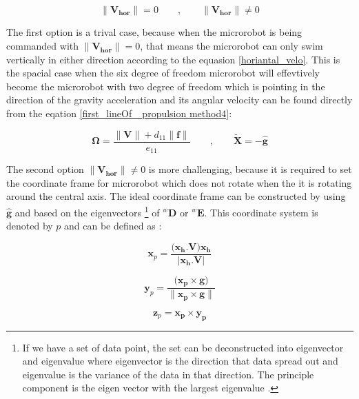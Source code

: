 \documentclass[12pt,a4paper,titlepage]{report}
\begin{document}
\begin{equation}
 {\| \bm {{V}_{hor}}\|}  = 0 \qquad ,  \qquad  {\| \bm{{V}_{hor}}\|} \neq 0
\label{total_force_torque}
\end{equation}

The first option is a trival case, because when the microrobot is being commanded with
$ {\| \bm {{V}_{hor}}\|}  = 0$, that means the microrobot can only swim vertically in either 
direction according to the equasion \ref{horiantal_velo}. This is the spacial case when the six degree of
freedom microrobot will effevtively become the microrobot with two degree of freedom which is pointing
in the direction of the gravity acceleration and its angular velocity can be found directly from the eqation
\ref{first_lineOf_ propulsion method4}:


\begin{equation}
 \bm {\Omega}  = \frac{{\| \bm{V}\|}+ d_{11}\| \bm{f}\|}{e_{11}}  \qquad ,  \qquad  \tilde{\bm{X}} = -\hat{\bm{g}}
\label{angular_velo_horiVelo=0}
\end{equation}

The second option ${\| \bm{{V}_{hor}}\|} \neq 0$ is more challenging, because it is required to set 
the coordinate frame for microrobot which does not rotate when the it is rotating around the central axis.
The ideal coordinate frame can be constructed by using $\hat{\bm{g}}$ and based on the eigenvectors
\footnote{If we have a set of data point, the set can be deconstructed into eigenvector and eigenvalue
where eigenvector is the direction that data spread out and eigenvalue is the variance of the data in that
direction. The principle component is the eigen vector with the largest eigenvalue \citep{Doe:2013Oct:Online}.} of 
$^{w}\bm{D}$ or $^{w}\bm{E}$. This coordinate system is denoted by $p$ and can be defined as :


\begin{equation}
 \bm{x}_p = \frac{(\bm{{x}_h . V )x_h}}{|\bm{x_h .V}|}
\label{x_pAxis}
\end{equation}



\begin{equation}
 \bm{y}_p = \frac{(\bm{{x}_p \times g)}}{\| \bm{x_p \times g}\|} 
\label{y_pAxis}
\end{equation}


\begin{equation}
 \bm{z}_p = \bm{{x}_p \times {y}_p}
\label{z_pAxis}
\end{equation}
\end{document}
